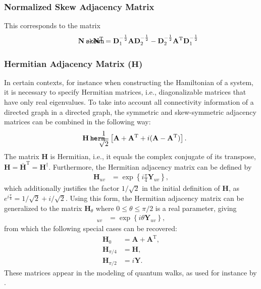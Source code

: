 \documentclass{article}
\def\mathnote#1{%
  \tag*{\rlap{\hspace\marginparsep\smash{\parbox[t]{\marginparwidth}{#1}}}}
}
\begin{document}
\subsubsection{Normalized Skew Adjacency Matrix}
\label{sec:matrix.skewn}
This corresponds to the matrix
\begin{align}
  \mathnote{\texttt{skewn}}
  \mathbf N - \mathbf N^{\mathrm T} = 
  \mathbf D_1^{-\frac 1 2} \mathbf A \mathbf D_2^{-\frac 1 2} - 
  \mathbf D_2^{-\frac 1 2} \mathbf A^{\mathrm T} \mathbf D_1^{-\frac 1 2} 
\end{align}

\subsubsection{Hermitian Adjacency Matrix ($\mathbf H$)}
In certain contexts, for instance when constructing the Hamiltonian of a
system, it is necessary to specify Hermitian matrices, i.e.,
diagonalizable matrices that have only real eigenvalues.  To take into
account all connectivity information of a directed graph in a
directed graph, the symmetric and skew-symmetric adjacency matrices can
be combined in the following way:
\begin{align}
  \mathnote{\texttt{herm}}
  \mathbf H &= \frac 1 {\sqrt 2} \left[
  \mathbf A + \mathbf A^{\mathrm T} + i(\mathbf A - \mathbf A^{\mathrm T})
  \right]. 
\end{align}
The matrix $\mathbf H$ is Hermitian, i.e., it equals the complex
conjugate of its transpose, $\mathbf H = \mathbf {\bar H}^{\mathrm T} =
\mathbf H^{\dagger}$.
Furthermore, the Hermitian adjacency matrix can be defined by
\begin{align}
  \mathbf H_{uv} &= \exp\left\{i \frac \pi 4 \mathbf Y_{uv}\right\},
\end{align}
which additionally justifies the factor $1/\sqrt 2$ in the initial
definition of $\mathbf H$, as $e^{i \frac \pi 4} = 1/\sqrt 2 + i/\sqrt
2$.  Using this form, the Hermitian adjacency matrix can be generalized
to the matrix $\mathbf H_\theta$ where $0 \leq \theta \leq \pi/2$ is a
real parameter, giving 
\begin{align}
  [\mathbf H_{\theta}]_{uv} &= \exp\left\{i \theta \mathbf Y_{uv} \right\},  
\end{align}
from which the following special cases can be recovered:
\begin{align}
  \mathbf H_0 &= \mathbf A + \mathbf A^{\mathrm T}, \\
  \mathbf H_{\pi/4} &= \mathbf H, \\
  \mathbf H_{\pi/2} &= i \mathbf Y.
\end{align}
These matrices appear in the modeling of quantum walks, as used for
instance by \cite{toedtli:ctqw}.  
\end{document}
